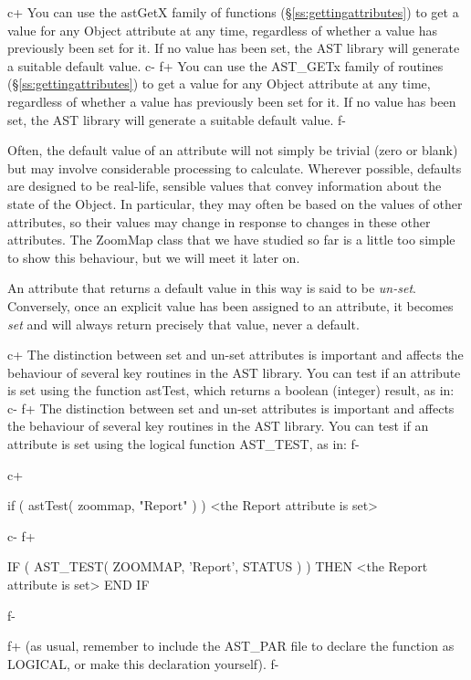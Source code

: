 \documentclass[twoside,11pt]{starlink}
\providecommand{\secref}[1]{\S\ref{#1}}
\begin{document}
c+
You can use the astGetX family of functions
(\secref{ss:gettingattributes}) to get a value for any Object attribute
at any time, regardless of whether a value has previously been set for
it. If no value has been set, the AST library will generate a suitable
default value.
c-
f+
You can use the AST\_GETx family of routines
(\secref{ss:gettingattributes}) to get a value for any Object attribute
at any time, regardless of whether a value has previously been set for
it. If no value has been set, the AST library will generate a suitable
default value.
f-

Often, the default value of an attribute will not simply be trivial
(zero or blank) but may involve considerable processing to
calculate. Wherever possible, defaults are designed to be real-life,
sensible values that convey information about the state of the
Object. In particular, they may often be based on the values of other
attributes, so their values may change in response to changes in these
other attributes. The ZoomMap class that we have studied so far is a
little too simple to show this behaviour, but we will meet it later
on.

An attribute that returns a default value in this way is said to be
\emph{un-set}. Conversely, once an explicit value has been assigned to
an attribute, it becomes \emph{set} and will always return precisely
that value, never a default.

c+
The distinction between set and un-set attributes is important and
affects the behaviour of several key routines in the AST library. You
can test if an attribute is set using the function astTest, which
returns a boolean (integer) result, as in:
c-
f+
The distinction between set and un-set attributes is important and
affects the behaviour of several key routines in the AST library. You
can test if an attribute is set using the logical function AST\_TEST,
as in:
f-

c+
\small
\begin{terminalv}
if ( astTest( zoommap, "Report" ) ) {
   <the Report attribute is set>
}
\end{terminalv}
\normalsize
c-
f+
\small
\begin{terminalv}
      IF ( AST_TEST( ZOOMMAP, 'Report', STATUS ) ) THEN
         <the Report attribute is set>
      END IF
\end{terminalv}
\normalsize
f-

f+
(as usual, remember to include the AST\_PAR file to declare the
function as LOGICAL, or make this declaration yourself).
f-
\end{document}
